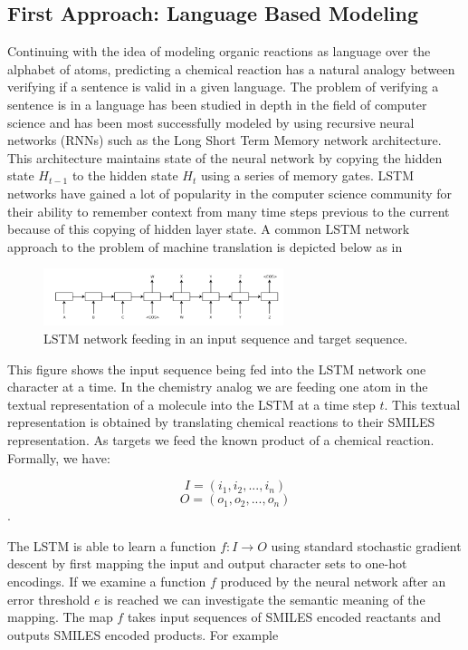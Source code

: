 \documentclass[aps,floatfix,prd,showpacs]{revtex4}
\begin{document}
\subsection{First Approach: Language Based Modeling }
Continuing with the idea of modeling organic reactions as language over the alphabet of atoms, predicting a chemical reaction has a natural analogy between verifying if a sentence is valid in a given language. The problem of verifying a sentence is in a language has been studied in depth in the field of computer science and has been most successfully modeled by using recursive neural networks (RNNs) such as the Long Short Term Memory network architecture. \cite{s2s} This architecture maintains state of the neural network by copying the hidden state $H_{t-1}$ to the hidden state $H_{t}$ using a series of memory gates. LSTM networks have gained a lot of popularity in the computer science community for their ability to remember context from many time steps previous to the current because of this copying of hidden layer state. \cite{unreasonable} A common LSTM network approach to the problem of machine translation is depicted below as in \cite{lamport} 
\begin{figure}[ht]
\includegraphics[width=7cm,angle=0]{fig1.png}
\caption{LSTM network feeding in an input sequence and target sequence.}
\label{fig1}
\end{figure}

This figure shows the input sequence being fed into the LSTM network one character at a time. In the chemistry analog we are feeding one atom in the textual representation of a molecule into the LSTM at a time step $t$. This textual representation is obtained by translating chemical reactions to their SMILES representation. \cite{SMILES} As targets we feed the known product of a chemical reaction. Formally, we have:

$$ I = (i_1,i_2,...,i_n)$$   $$ O = (o_1,o_2,...,o_n)$$. 

The LSTM is able to learn a function $f: I \rightarrow O$  using standard stochastic gradient descent by first mapping the input and output character sets to one-hot encodings. If we examine a function $f$ produced by the neural network after an error threshold $e$ is reached we can investigate the semantic meaning of the mapping. The map $f$ takes input sequences of SMILES encoded reactants and outputs SMILES encoded products. For example \\
\end{document}
